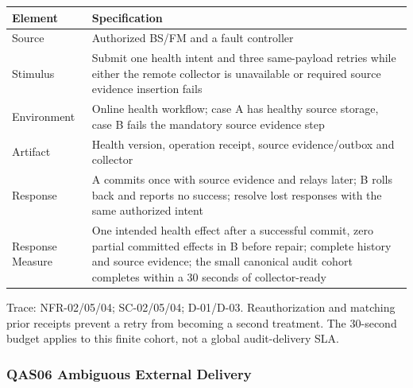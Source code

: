 {\small
\begin{longtable}[]{|>{\raggedright\arraybackslash}p{}|>{\raggedright\arraybackslash}p{}|}
\hline
\textbf{Element} & \textbf{Specification} \\ \hline
\endhead
Source & Authorized BS/FM and a fault controller \\ \hline
Stimulus & Submit one health intent and three same-payload retries while
either the remote collector is unavailable or required source evidence
insertion fails \\ \hline
Environment & Online health workflow; case A has healthy source storage,
case B fails the mandatory source evidence step \\ \hline
Artifact & Health version, operation receipt, source evidence/outbox and
collector \\ \hline
Response & A commits once with source evidence and relays later; B rolls
back and reports no success; resolve lost responses with the same
authorized intent \\ \hline
Response Measure & One intended health effect after a successful commit,
zero partial committed effects in B before repair; complete history and
source evidence; the small canonical audit cohort completes within a
30 seconds of collector-ready \\ \hline
\end{longtable}
}

Trace: NFR-02/05/04; SC-02/05/04; D-01/D-03. Reauthorization and
matching prior receipts prevent a retry from becoming a second
treatment. The 30-second budget applies to this finite cohort, not a
global audit-delivery SLA.

\subsubsection{QAS06 Ambiguous External Delivery}\label{sec:3.4.6}

